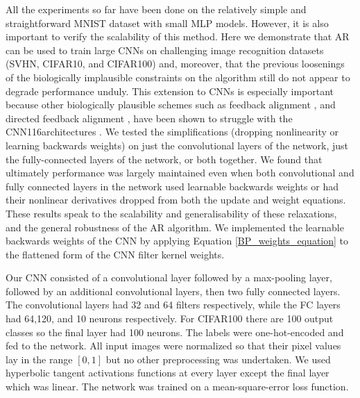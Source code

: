 All the experiments so far have been done on the relatively simple and straightforward MNIST dataset with small MLP models. However, it is also important to verify the scalability of this method. Here we demonstrate that AR can be used to train large CNNs on challenging image recognition datasets (SVHN, CIFAR10, and CIFAR100) and, moreover, that the previous loosenings of the biologically implausible constraints on the algorithm still do not appear to degrade performance unduly. This extension to CNNs is especially important because other biologically plausible schemes such as feedback alignment \citep{lillicrap2016random,lillicrap2014random}, and directed feedback alignment \citep{nokland2016direct}, have been shown to struggle with the CNN116architectures \citep{launay2019principled}. We tested the simplifications (dropping nonlinearity or learning backwards weights) on just the convolutional layers of the network, just the fully-connected layers of the network, or both together. We found that ultimately performance was largely maintained even when both convolutional and fully connected layers in the network used learnable backwards weights or had their nonlinear derivatives dropped from both the update and weight equations. These results speak to the scalability and generalisability of these relaxations, and the general robustness of the AR algorithm. We implemented the learnable backwards weights of the CNN by applying Equation \ref{BP_weights_equation} to the flattened form of the CNN filter kernel weights.

Our CNN consisted of a convolutional layer followed by a max-pooling layer, followed by an additional convolutional layers, then two fully connected layers. The convolutional layers had 32 and 64 filters respectively, while the FC layers had 64,120, and 10 neurons respectively. For CIFAR100 there are 100 output classes so the final layer had 100 neurons. The labels were one-hot-encoded and fed to the network. All input images were normalized so that their pixel values lay in the range $[0,1]$ but no other preprocessing was undertaken. We used hyperbolic tangent activations functions at every layer except the final layer which was linear. The network was trained on a mean-square-error loss function. 

